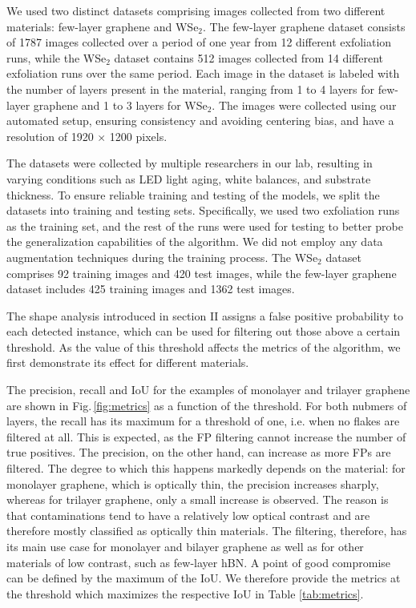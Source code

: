 \documentclass[reprint, prl, superscriptaddress, floatfix]{revtex4-2}
\newcommand{\fig}[1]{Fig.\,\ref{#1}}
\begin{document}
We used two distinct datasets comprising images collected from two different materials: few-layer graphene and WSe$_2$. 
The few-layer graphene dataset consists of 1787 images collected over a period of one year from 12 different exfoliation runs, while the WSe$_2$ dataset contains 512 images collected from 14 different exfoliation runs over the same period.
Each image in the dataset is labeled with the number of layers present in the material, ranging from 1 to 4 layers for few-layer graphene and 1 to 3 layers for WSe$_2$. The images were collected using our automated setup, ensuring consistency and avoiding centering bias, and have a resolution of 1920 $\times$ 1200 pixels.

The datasets were collected by multiple researchers in our lab, resulting in varying conditions such as LED light aging, white balances, and substrate thickness. To ensure reliable training and testing of the models, we split the datasets into training and testing sets. Specifically, we used two exfoliation runs as the training set, and the rest of the runs were used for testing to better probe the generalization capabilities of the algorithm.
We did not employ any data augmentation techniques during the training process. The WSe$_2$ dataset comprises 92 training images and 420 test images, while the few-layer graphene dataset includes 425 training images and 1362 test images.

The shape analysis introduced in section II assigns a false positive probability to each detected instance, which can be used for filtering out those above a certain threshold.  
As the value of this threshold affects the metrics of the algorithm, we first demonstrate its effect for different materials. 

The precision, recall and IoU for the examples of monolayer and trilayer graphene are shown in \fig{fig:metrics} as a function of the threshold.
For both nubmers of layers, the recall has its maximum for a threshold of one, i.e. when no flakes are filtered at all.
This is expected, as the FP filtering cannot increase the number of true positives. 
The precision, on the other hand, can increase as more FPs are filtered. 
The degree to which this happens markedly depends on the  material: for monolayer graphene, which is optically thin, the precision increases sharply, whereas for trilayer graphene, only a small increase is observed. 
The reason is that contaminations tend to have a relatively low optical contrast and are therefore mostly classified as optically thin materials.
The filtering, therefore, has its main use case for monolayer and bilayer graphene as well as for other materials of low contrast, such as few-layer hBN. 
A point of good compromise can be defined by the maximum of the IoU.
We therefore provide the metrics at the threshold which maximizes the respective IoU in Table \ref{tab:metrics}. 
\end{document}
